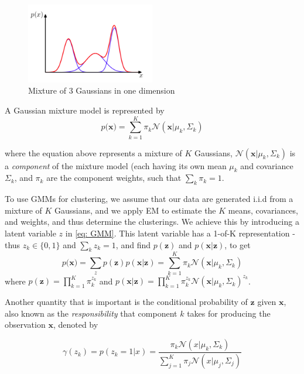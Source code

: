 \begin{figure}[h]
    \centering
    \includegraphics[width=0.5\textwidth]{Figures/GMM.png}
    \caption{Mixture of 3 Gaussians in one dimension}
    \label{fig:GMM}
\end{figure}

A Gaussian mixture model is represented by 
\begin{equation} \label{eq: GMM}
    p(\mathbf{x)} = \sum_{k=1}^{K} \pi_k \mathcal{N} ( \mathbf{x} | \mu_k, \Sigma_k)
\end{equation}

where the equation above represents a mixture of $K$ Gaussians, $\mathcal{N} ( \mathbf{x} | \mu_k, \Sigma_k)$ is a \textit{component} of the mixture model (each having its own mean $\mu_k$ and covariance $\Sigma_k$, and $\pi_k$ are the component weights, such that $\sum_k \pi_k = 1$.

To use GMMs for clustering, we assume that our data are generated i.i.d from a mixture of $K$ Gaussians, and we apply EM to estimate the $K$ means, covariances, and weights, and thus determine the clusterings. We achieve this by introducing a latent variable $z$ in \eqref{eq: GMM}. This latent variable has a 1-of-K representation - thus $z_k \in \{0,1\}$ and $\sum_k z_k=1$, and find $p(\mathbf{z})$ and $p(\mathbf{x|z})$, to get
\begin{equation} \label{eq: GMM_latent}
    p(\mathbf{x)} = \sum_z p(\mathbf{z})p(\mathbf{x|z})= \sum_{k=1}^{K} \pi_k \mathcal{N} ( \mathbf{x} | \mu_k, \Sigma_k)
\end{equation}
where $p(\mathbf{z}) = \displaystyle \prod_{k=1}^{K} \pi_k^{z_k}$ and $p(\mathbf{x|z}) = \displaystyle \prod_{k=1}^{K} \pi_k^{z_k} \mathcal{N} ( \mathbf{x} | \mu_k, \Sigma_k)^{z_k} $. 

Another quantity that is important is the conditional probability of $\mathbf{z}$ given $\mathbf{x}$, also known as the \textit{responsibility} that component $k$ takes for producing the observation $\mathbf{x}$, denoted by 

\begin{equation} \label{eq:respons}
    \gamma(z_k) = p(z_k = 1|x) = \frac{\pi_k \mathcal{N}(x|\mu_k,\Sigma_k)}{\sum_{j=1}^{K} \pi_j \mathcal{N} (x|\mu_j, \Sigma_j)}
\end{equation}

